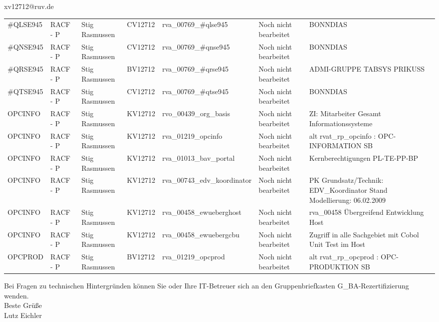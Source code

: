 \documentclass[a4paper,landscape,12pt]{letter}
\begin{document}
\begin{letter}{xv12712@ruv.de\hfill \break}
\begin{tiny}
\begin{longtable}{|p{35mm}|p{15mm}|p{25mm}|p{10mm}|p{40mm}|p{50mm}|p{50mm}|}
\#QLSE945 & RACF - P & Stig Rasmussen & CV12712 & rva\_00769\_\#qlse945 & Noch nicht bearbeitet & BONNDIAS \\
\#QNSE945 & RACF - P & Stig Rasmussen & CV12712 & rva\_00769\_\#qnse945 & Noch nicht bearbeitet & BONNDIAS \\
\#QRSE945 & RACF - P & Stig Rasmussen & BV12712 & rva\_00769\_\#qrse945 & Noch nicht bearbeitet & ADMI-GRUPPE TABSYS PRIKUSS \\
\#QTSE945 & RACF - P & Stig Rasmussen & CV12712 & rva\_00769\_\#qtse945 & Noch nicht bearbeitet & BONNDIAS \\
OPCINFO & RACF - P & Stig Rasmussen & KV12712 & rvo\_00439\_org\_basis & Noch nicht bearbeitet & ZI: Mitarbeiter Gesamt Informationssysteme \\
OPCINFO & RACF - P & Stig Rasmussen & KV12712 & rva\_01219\_opcinfo & Noch nicht bearbeitet & alt rvat\_rp\_opcinfo          : OPC- INFORMATION                         SB \\
OPCINFO & RACF - P & Stig Rasmussen & KV12712 & rva\_01013\_bav\_portal & Noch nicht bearbeitet & Kernberechtigungen PL-TE-PP-BP \\
OPCINFO & RACF - P & Stig Rasmussen & KV12712 & rva\_00743\_edv\_koordinator & Noch nicht bearbeitet & PK Grundsatz/Technik: EDV\_Koordinator Stand Modellierung: 06.02.2009 \\
OPCINFO & RACF - P & Stig Rasmussen & KV12712 & rva\_00458\_ewueberghost & Noch nicht bearbeitet & rva\_00458 Übergreifend Entwicklung Host \\
OPCINFO & RACF - P & Stig Rasmussen & KV12712 & rva\_00458\_ewuebergcbu & Noch nicht bearbeitet & Zugriff in alle Sachgebiet mit Cobol Unit Test im Host \\
OPCPROD & RACF - P & Stig Rasmussen & BV12712 & rva\_01219\_opcprod & Noch nicht bearbeitet & alt rvat\_rp\_opcprod          : OPC-PRODUKTION                           SB \\

\hline
		\end{longtable}
		\end{tiny}
	
\begin{minipage}{\textwidth}
			Bei Fragen zu technischen Hintergründen können Sie 
			oder Ihre IT-Betreuer sich an den Gruppenbriefkasten 
			G\_BA-Rezertifizierung
			wenden.\\
			\linebreak
			Beste Grüße\\
			Lutz Eichler
	\end{minipage}
	\end{letter}
	
\end{document}
